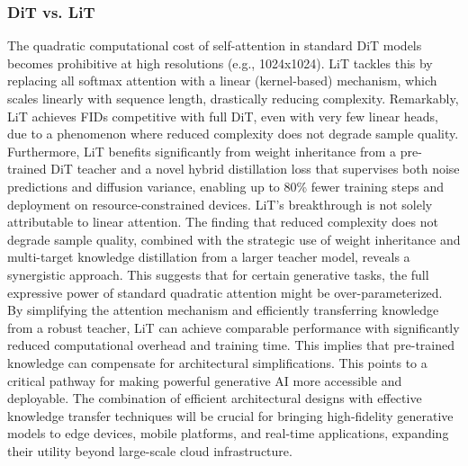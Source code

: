 \documentclass[a4paper]{article}
\begin{document}
\subsubsection*{DiT vs. LiT}
The quadratic computational cost of self-attention in standard DiT models becomes prohibitive at high resolutions (e.g., 1024x1024). LiT \cite{Jiang2025LiT} tackles this by replacing all softmax attention with a linear (kernel-based) mechanism, which scales linearly with sequence length, drastically reducing complexity. Remarkably, LiT achieves FIDs competitive with full DiT, even with very few linear heads, due to a phenomenon where reduced complexity does not degrade sample quality. Furthermore, LiT benefits significantly from weight inheritance from a pre-trained DiT teacher and a novel hybrid distillation loss that supervises both noise predictions and diffusion variance, enabling up to 80\% fewer training steps and deployment on resource-constrained devices. LiT's breakthrough is not solely attributable to linear attention. The finding that reduced complexity does not degrade sample quality, combined with the strategic use of weight inheritance and multi-target knowledge distillation from a larger teacher model, reveals a synergistic approach. This suggests that for certain generative tasks, the full expressive power of standard quadratic attention might be over-parameterized. By simplifying the attention mechanism and efficiently transferring knowledge from a robust teacher, LiT can achieve comparable performance with significantly reduced computational overhead and training time. This implies that pre-trained knowledge can compensate for architectural simplifications. This points to a critical pathway for making powerful generative AI more accessible and deployable. The combination of efficient architectural designs with effective knowledge transfer techniques will be crucial for bringing high-fidelity generative models to edge devices, mobile platforms, and real-time applications, expanding their utility beyond large-scale cloud infrastructure.
\end{document}
